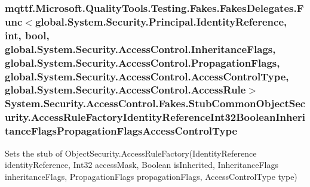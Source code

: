 \hypertarget{class_system_1_1_security_1_1_access_control_1_1_fakes_1_1_stub_common_object_security_a3ad461dd876fee77527592462dce8c19}{
\subsubsection[{Access\-Rule\-Factory\-Identity\-Reference\-Int32\-Boolean\-Inheritance\-Flags\-Propagation\-Flags\-Access\-Control\-Type}]{\setlength{\rightskip}{0pt plus 5cm}mqttf.\-Microsoft.\-Quality\-Tools.\-Testing.\-Fakes.\-Fakes\-Delegates.\-Func$<$global.\-System.\-Security.\-Principal.\-Identity\-Reference, int, bool, global.\-System.\-Security.\-Access\-Control.\-Inheritance\-Flags, global.\-System.\-Security.\-Access\-Control.\-Propagation\-Flags, global.\-System.\-Security.\-Access\-Control.\-Access\-Control\-Type, global.\-System.\-Security.\-Access\-Control.\-Access\-Rule$>$ System.\-Security.\-Access\-Control.\-Fakes.\-Stub\-Common\-Object\-Security.\-Access\-Rule\-Factory\-Identity\-Reference\-Int32\-Boolean\-Inheritance\-Flags\-Propagation\-Flags\-Access\-Control\-Type}}\label{class_system_1_1_security_1_1_access_control_1_1_fakes_1_1_stub_common_object_security_a3ad461dd876fee77527592462dce8c19}


Sets the stub of Object\-Security.\-Access\-Rule\-Factory(\-Identity\-Reference identity\-Reference, Int32 access\-Mask, Boolean is\-Inherited, Inheritance\-Flags inheritance\-Flags, Propagation\-Flags propagation\-Flags, Access\-Control\-Type type)

